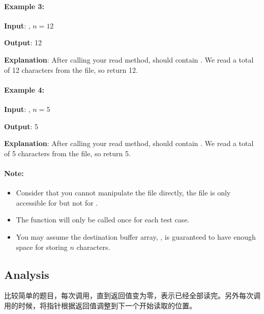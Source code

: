 \paragraph{Example 3:}

\begin{flushleft}
\textbf{Input}: , $n = 12$

\textbf{Output}: 12

\textbf{Explanation}: After calling your read method,  should contain . We read a total of 12 characters from the file, so return 12.
\end{flushleft}

\paragraph{Example 4:}

\begin{flushleft}
\textbf{Input}: , $n = 5$

\textbf{Output}: 5

\textbf{Explanation}: After calling your read method,  should contain . We read a total of 5 characters from the file, so return 5.
\end{flushleft}
 

\paragraph{Note:}

\begin{itemize}
\item Consider that you cannot manipulate the file directly, the file is only accessible for  but not for .
\item The  function will only be called once for each test case.
\item You may assume the destination buffer array, , is guaranteed to have enough space for storing $n$ characters.
\end{itemize}
\subsection{Analysis}

比较简单的题目，每次调用，直到返回值变为零，表示已经全部读完。另外每次调用的时候，将指针根据返回值调整到下一个开始读取的位置。

